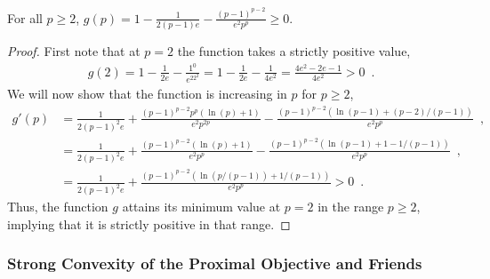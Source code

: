 \begin{lemma}\label{lem:small_lemma_for_hessian_stability_two}
    For all $p\geq 2$, $g(p) = 1-\frac{1}{2(p-1)e} - \frac{(p-1)^{p-2}}{e^2p^p} \geq 0$.
\end{lemma}
\begin{proof}
    First note that at $p=2$ the function takes a strictly positive value,
    \begin{align*}
        g(2) = 1 - \frac{1}{2e} -\frac{1^0}{e^22^2} = 1 - \frac{1}{2e} - \frac{1}{4e^2} = \frac{4e^2 - 2e - 1}{4e^2} > 0\enspace.
    \end{align*}
    We will now show that the function is increasing in $p$ for $p\geq 2$,
    \begin{align*}
        g'(p) &= \frac{1}{2(p-1)^2e} + \frac{(p-1)^{p-2}p^p(\ln(p) + 1)}{e^2p^{2p}} - \frac{(p-1)^{p-2}(\ln(p-1) + (p-2)/(p-1))}{e^2p^p}\enspace,\\
        &= \frac{1}{2(p-1)^2e} + \frac{(p-1)^{p-2}(\ln(p) + 1)}{e^2p^{p}} - \frac{(p-1)^{p-2}(\ln(p-1) + 1 - 1/(p-1))}{e^2p^p}\enspace,\\
        &= \frac{1}{2(p-1)^2e} + \frac{(p-1)^{p-2}\left(\ln(p/(p-1)) + 1/(p-1)\right)}{e^2p^{p}} > 0\enspace.
    \end{align*}
    Thus, the function $g$ attains its minimum value at $p=2$ in the range $p\geq2$, implying that it is strictly positive in that range.
\end{proof}

\subsubsection{Strong Convexity of the Proximal Objective and Friends}

